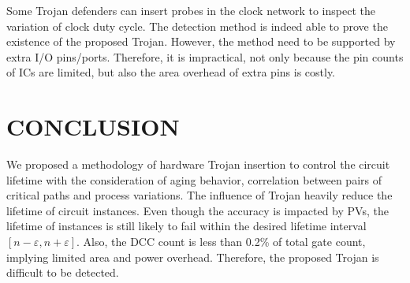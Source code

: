 Some Trojan defenders can insert probes in the clock network to inspect the variation of clock duty cycle. The detection method is indeed able to prove the existence of the proposed Trojan. However, the method need to be supported by extra I/O pins/ports. Therefore, it is impractical, not only because the pin counts of ICs are limited, but also the area overhead of extra pins is costly.


\section{CONCLUSION}
We proposed a methodology of hardware Trojan insertion to control the circuit lifetime with the consideration of aging behavior, correlation between pairs of critical paths and process variations. The influence of Trojan heavily reduce the lifetime of circuit instances. Even though the accuracy is impacted by PVs, the lifetime of instances is still likely to fail within the desired lifetime interval $[n - \varepsilon, n + \varepsilon]$. Also, the DCC count is less than 0.2\% of total gate count, implying limited area and power overhead. Therefore, the proposed Trojan is difficult to be detected.
